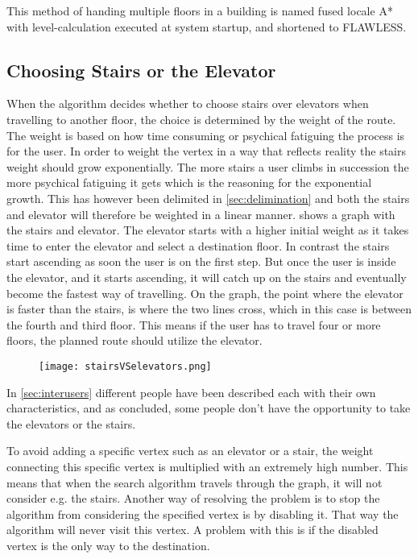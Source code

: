 This method of handing multiple floors in a building is named fused locale A* with level-calculation executed at system startup, and shortened to FLAWLESS.


\subsection{Choosing Stairs or the Elevator}

When the algorithm decides whether to choose stairs over elevators when travelling to another floor, the choice is determined by the weight of the route. The weight is based on how time consuming or psychical fatiguing the process is for the user. In order to weight the vertex in a way that reflects reality the stairs weight should grow exponentially. The more stairs a user climbs in succession the more psychical fatiguing it gets which is the reasoning for the exponential growth. This has however been delimited in \cref{sec:delimination} and both the stairs and elevator will therefore be weighted in a linear manner.  shows a graph with the stairs and elevator. The elevator starts with a higher initial weight as it takes time to enter the elevator and select a destination floor. In contrast the stairs start ascending as soon the user is on the first step. But once the user is inside the elevator, and it starts ascending, it will catch up on the stairs and eventually become the fastest way of travelling. On the graph, the point where the elevator is faster than the stairs, is where the two lines cross, which in this case is between the fourth and third floor. This means if the user has to travel four or more floors, the planned route should utilize the elevator.

\begin{figure}[ht!]
    \centering
    \texttt{[image: stairsVSelevators.png]}
    \caption{}\label{fig:labeled_stairsVSelevators}
  \end{figure}


In \cref{sec:interusers} different people have been described each with their own characteristics, and as concluded, some people don't have the opportunity to take the elevators or the stairs. 

To avoid adding a specific vertex such as an elevator or a stair, the weight connecting this specific vertex is multiplied with an extremely high number. This means that when the search algorithm travels through the graph, it will not consider e.g. the stairs.
Another way of resolving the problem is to stop the algorithm from considering the specified vertex is by disabling it. That way the algorithm will never visit this vertex. A problem with this is if the disabled vertex is the only way to the destination.



